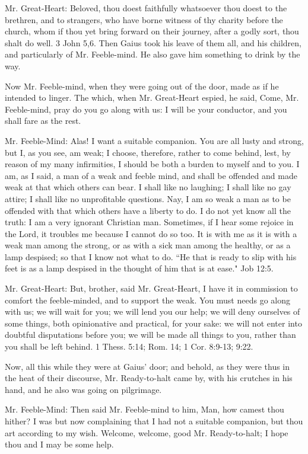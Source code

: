 Mr. Great-Heart: Beloved, thou doest faithfully whatsoever thou doest to the brethren, and to strangers, who have borne witness of thy charity before the church, whom if thou yet bring forward on their journey, after a godly sort, thou shalt do well. 3 John 5,6. Then Gaius took his leave of them all, and his children, and particularly of Mr. Feeble-mind. He also gave him something to drink by the way.

Now Mr. Feeble-mind, when they were going out of the door, made as if he intended to linger. The which, when Mr. Great-Heart espied, he said, Come, Mr. Feeble-mind, pray do you go along with us: I will be your conductor, and you shall fare as the rest.

Mr. Feeble-Mind: Alas! I want a suitable companion. You are all lusty and strong, but I, as you see, am weak; I choose, therefore, rather to come behind, lest, by reason of my many infirmities, I should be both a burden to myself and to you. I am, as I said, a man of a weak and feeble mind, and shall be offended and made weak at that which others can bear. I shall like no laughing; I shall like no gay attire; I shall like no unprofitable questions. Nay, I am so weak a man as to be offended with that which others have a liberty to do. I do not yet know all the truth: I am a very ignorant Christian man. Sometimes, if I hear some rejoice in the Lord, it troubles me because I cannot do so too. It is with me as it is with a weak man among the strong, or as with a sick man among the healthy, or as a lamp despised; so that I know not what to do. ``He that is ready to slip with his feet is as a lamp despised in the thought of him that is at ease." Job 12:5.

Mr. Great-Heart: But, brother, said Mr. Great-Heart, I have it in commission to comfort the feeble-minded, and to support the weak. You must needs go along with us; we will wait for you; we will lend you our help; we will deny ourselves of some things, both opinionative and practical, for your sake: we will not enter into doubtful disputations before you; we will be made all things to you, rather than you shall be left behind. 1 Thess. 5:14; Rom. 14; 1 Cor. 8:9-13; 9:22.

Now, all this while they were at Gaius' door; and behold, as they were thus in the heat of their discourse, Mr. Ready-to-halt came by, with his crutches in his hand, and he also was going on pilgrimage.

Mr. Feeble-Mind: Then said Mr. Feeble-mind to him, Man, how camest thou hither? I was but now complaining that I had not a suitable companion, but thou art according to my wish. Welcome, welcome, good Mr. Ready-to-halt; I hope thou and I may be some help.

